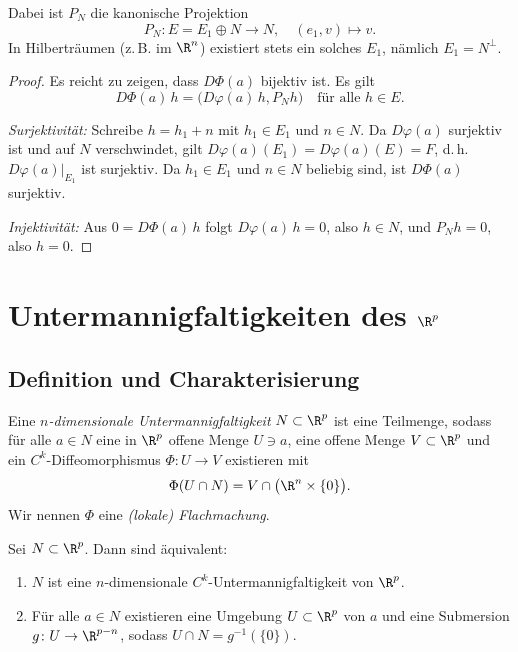 \documentclass[11pt]{article}
\begin{document}
\begin{note}
  Dabei ist $P_N$ die kanonische Projektion
  \[ P_N\colon E = E_1 \oplus N \to N, \quad (e_1, v) \mapsto v. \]
  In Hilberträumen (z.\,B. im $\R^n$) existiert stets ein solches $E_1$, nämlich $E_1 = N^\perp$.
\end{note}

\begin{proof}
  Es reicht zu zeigen, dass $D\Phi(a)$ bijektiv ist. Es gilt
  \[ D\Phi(a)\, h = \bigl(D\varphi(a)\, h, P_N h\bigr) \quad \text{für alle } h \in E. \]


  \textit{Surjektivität:} Schreibe $h = h_1 + n$ mit $h_1 \in E_1$ und $n \in N$. Da $D\varphi(a)$ surjektiv ist und auf $N$ verschwindet, gilt $D\varphi(a)(E_1) = D\varphi(a)(E) = F$, d.\,h. $D\varphi(a)|_{E_1}$ ist surjektiv. Da $h_1 \in E_1$ und $n \in N$ beliebig sind, ist $D\Phi(a)$ surjektiv.


  \textit{Injektivität:} Aus $0 = D\Phi(a)\, h$ folgt $D\varphi(a)\, h = 0$, also $h \in N$, und $P_N h = 0$, also $h = 0$.
\end{proof}

\section{Untermannigfaltigkeiten des \texorpdfstring{$\R^p$}{Rp}}

\subsection{Definition und Charakterisierung}

\begin{definition}[Untermannigfaltigkeit]\Theorem
  Eine \emph{$n$-dimensionale Untermannigfaltigkeit} $N \subset \R^p$ ist eine Teilmenge, sodass für alle $a \in N$ eine in $\R^p$ offene Menge $U \ni a$, eine offene Menge $V \subset \R^p$ und ein $C^k$-Diffeomorphismus $\Phi\colon U \to V$ existieren mit
  \[ \Phi(U \cap N) = V \cap \bigl(\R^n \times \{0\}\bigr). \]
  Wir nennen $\Phi$ eine \emph{(lokale) Flachmachung}.
\end{definition}

\begin{proposition}\label{prop:umf-submersion}
  Sei $N \subset \R^p$. Dann sind äquivalent:
  \begin{enumerate}[label=(\alph*)]
    \item $N$ ist eine $n$-dimensionale $C^k$-Untermannigfaltigkeit von $\R^p$.
    \item Für alle $a \in N$ existieren eine Umgebung $U \subset \R^p$ von $a$ und eine Submersion $g\colon U \to \R^{p-n}$, sodass $U \cap N = g^{-1}(\{0\})$.
  \end{enumerate}
\end{proposition}
\end{document}
